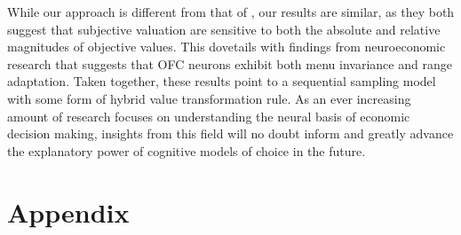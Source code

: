 \documentclass[11pt,a4paper]{article}
\begin{document}
While our approach is different from that of , our results are similar, as they both suggest that subjective valuation are sensitive to both the absolute and relative magnitudes of objective values. This dovetails with findings from neuroeconomic research that suggests that OFC neurons exhibit both menu invariance and range adaptation. Taken together, these results point to a sequential sampling model with some form of hybrid value transformation rule. As an ever increasing amount of research focuses on understanding the neural basis of economic decision making, insights from this field will no doubt inform and greatly advance the explanatory power of cognitive models of choice in the future.



\newpage



\clearpage

\section*{Appendix}
\end{document}
